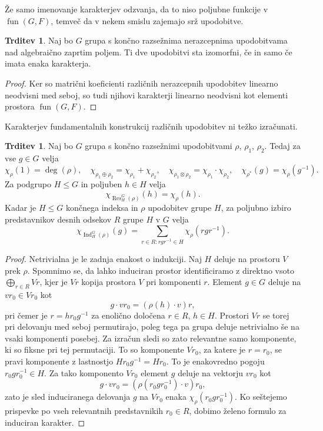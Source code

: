 \documentclass[11pt]{book}
\DeclareMathOperator\Res{Res}
\DeclareMathOperator\Ind{Ind}
\DeclareMathOperator\fun{fun}
\theoremstyle{definition}
\theoremstyle{zgled}
\theoremstyle{zgledbrezstevilke}
\theoremstyle{odprtproblem}
\theoremstyle{domacanaloga}
\newenvironment{dokaz}
    {\color{siva}\begin{proof}}
    {\end{proof}}
\theoremstyle{izrek}
\newtheorem{trditev}[theorem]{Trditev}
\begin{document}
Že samo imenovanje karakterjev odzvanja, da to niso poljubne funkcije v $\fun(G,F)$, temveč da v nekem smislu zajemajo srž upodobitve.

\begin{trditev}
Naj bo $G$ grupa s končno razsežnima nerazcepnima upodobitvama nad algebraično zaprtim poljem. Ti dve upodobitvi sta izomorfni, če in samo če imata enaka karakterja.
\end{trditev}
\begin{dokaz}
Ker so matrični koeficienti različnih nerazcepnih upodobitev linearno neodvisni med seboj, so tudi njihovi karakterji linearno neodvisni kot elementi prostora $\fun(G,F)$. 
\end{dokaz}

Karakterjev fundamentalnih konstrukcij različnih upodobitev ni težko izračunati.

\begin{trditev}
Naj bo $G$ grupa s končno razsežnimi upodobitvami $\rho$, $\rho_1$, $\rho_2$. Tedaj za vse $g \in G$ velja
\[
    \chi_{\rho}(1) = \deg(\rho), \quad
    \chi_{\rho_1 \oplus \rho_2} = \chi_{\rho_1} + \chi_{\rho_2}, \quad
    \chi_{\rho_1 \otimes \rho_2} = \chi_{\rho_1} \cdot \chi_{\rho_2}, \quad
    \chi_{\rho^*}(g) = \chi_{\rho}(g^{-1}).
\]
Za podgrupo $H \leq G$ in poljuben $h \in H$ velja
\[
    \chi_{\Res^G_H(\rho)}(h) = \chi_{\rho}(h).
\]
Kadar je $H \leq G$ končnega indeksa in $\rho$ upodobitev grupe $H$, za poljubno izbiro predstavnikov desnih odsekov $R$ grupe $H$ v $G$ velja
\[
    \chi_{\Ind^G_H(\rho)}(g) = \sum_{r \in R \colon r g r^{-1} \in H} \chi_{\rho}(r g r^{-1}).
\]
\end{trditev}
\begin{dokaz}
Netrivialna je le zadnja enakost o indukciji. Naj $H$ deluje na prostoru $V$ prek $\rho$. Spomnimo se, da lahko induciran prostor identificiramo z direktno vsoto $\bigoplus_{r \in R} V r$, kjer je $Vr$ kopija prostora $V$ pri komponenti $r$. Element $g \in G$ deluje na $v r_0 \in V r_0$ kot
\[
    g \cdot v r_0 = \left( \rho(h) \cdot v \right) r,
\]
pri čemer je $r = h r_0 g^{-1}$ za enolično določena $r \in R$, $h \in H$. Prostori $V r$ se torej pri delovanju med seboj permutirajo, poleg tega pa grupa deluje netrivialno še na vsaki komponenti posebej. Za izračun sledi so zato relevantne samo komponente, ki so fiksne pri tej permutaciji. To so komponente $Vr_0$, za katere je $r = r_0$, se pravi komponente z lastnostjo $H r_0 g^{-1} = H r_0$. To je enakovredno pogoju $r_0 g r_0^{-1} \in H$. Za tako komponento $V r_0$ element $g$ deluje na vektorju $v r_0$ kot
\[
    g \cdot v r_0 = \left( \rho(r_0 g r_0^{-1}) \cdot v \right) r_0,
\]
zato je sled induciranega delovanja $g$ na $V r_0$ enaka $\chi_{\rho}(r_0 g r_0^{-1})$. Ko seštejemo prispevke po vseh relevantnih predstavnikih $r_0 \in R$, dobimo želeno formulo za induciran karakter.
\end{dokaz}
\end{document}
